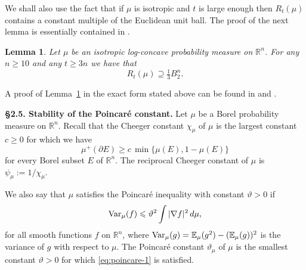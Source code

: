 \documentclass[11pt,leqno]{article}
\newtheorem{lemma}[theorem]{Lemma}
\theoremstyle{definition}
\theoremstyle{remark}
\numberwithin{equation}{section}
\newcommand{\ls}{\leqslant}
\newcommand{\gr}{\geqslant}
\newcommand{\1}{\textbf{1}}
\begin{document}
We shall also use the fact that if $\mu$ is isotropic and $t$ is large enough then $R_t(\mu)$ contains a constant multiple of the Euclidean unit ball.
The proof of the next lemma is essentially contained in \cite[Lemma~5.4]{Klartag-2007}. 

\begin{lemma}\label{lem:gamma-ball}Let $\mu$ be an isotropic log-concave probability measure on ${\mathbb R}^n$.
For any $n\gr 10$ and any $t\gr 3n$ we have that
$$R_t(\mu)\supseteq  \tfrac{1}{3}B_2^n.$$
\end{lemma}

A proof of Lemma~\ref{lem:gamma-ball} in the exact form stated above can be found in \cite[Lemma~3.4]{Giannopoulos-Tziotziou-2025} and \cite[Lemma~3.2]{BGHT}.


\bigskip 

\noindent \textbf{\S 2.5. Stability of the Poincar\'{e} constant.} Let $\mu $ be a Borel probability measure on ${\mathbb R}^n$. 
Recall that the Cheeger constant $\chi_{\mu }$ of $\mu $ is the largest constant $c\gr 0$ for which we have
\begin{equation}\label{eq:cheeger-1}\mu^+(\partial E)\gr c\,\min\{\mu (E),1-\mu (E)\}\end{equation}
for every Borel subset $E$ of ${\mathbb R}^n$. The reciprocal Cheeger constant of $\mu$ is $\psi_{\mu}:=1/\chi_{\mu}$. 

We also say that $\mu $ satisfies the Poincar\'{e} inequality with constant $\vartheta >0$ if
\begin{equation}\label{eq:poincare-1}{\rm Var}_\mu(f)\ls \vartheta^2\int |\nabla f|^2\, d\mu,
\end{equation}for all smooth functions $f$ on ${\mathbb R}^n$, where ${\rm Var}_\mu(g)={\mathbb E}_\mu(g^2)-({\mathbb E}_\mu(g))^2$ is the
variance of $g$ with respect to $\mu$. The Poincar\'{e} constant $\vartheta_{\mu }$ of $\mu $ is the smallest constant 
$\vartheta>0$ for which \eqref{eq:poincare-1} is satisfied.
\end{document}
